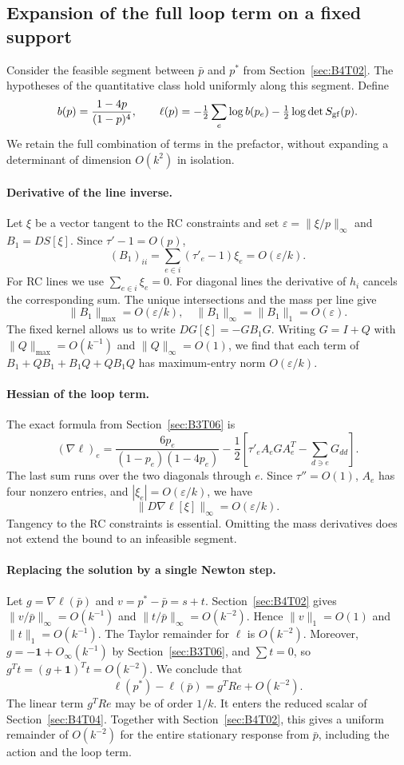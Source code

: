 \subsection{Expansion of the full loop term on a fixed support}\label{sec:B4T03}
Consider the feasible segment between $\bar p$ and $p^*$ from Section~\ref{sec:B4T02}.
The hypotheses of the quantitative class hold uniformly along this segment.
Define
\[
 b(p)=\frac{1-4p}{(1-p)^4},\qquad
 \ell(p)=-\tfrac12\sum_e\log b(p_e)-\tfrac12\log\det S_{\rm gf}(p).
\]
We retain the full combination of terms in the prefactor, without expanding a determinant of dimension
$O(k^2)$ in isolation.

\paragraph{Derivative of the line inverse.}
Let $\xi$ be a vector tangent to the RC constraints and set $\varepsilon=\|\xi/p\|_\infty$ and
$B_1=DS[\xi]$. Since $\tau'-1=O(p)$,
\[
 (B_1)_{ii}=\sum_{e\in i}(\tau'_e-1)\xi_e=O(\varepsilon/k).
\]
For RC lines we use $\sum_{e\in i}\xi_e=0$. For diagonal lines the derivative of $h_i$ cancels the
corresponding sum. The unique intersections and the mass per line give
\[
 \|B_1\|_{\max}=O(\varepsilon/k),\quad
 \|B_1\|_\infty=\|B_1\|_1=O(\varepsilon).
\]
The fixed kernel allows us to write $DG[\xi]=-GB_1G$. Writing $G=I+Q$ with $\|Q\|_{\max}=O(k^{-1})$ and
$\|Q\|_\infty=O(1)$, we find that each term of $B_1+QB_1+B_1Q+QB_1Q$ has maximum-entry norm
$O(\varepsilon/k)$.

\paragraph{Hessian of the loop term.}
The exact formula from Section~\ref{sec:B3T06} is
\[
 (\nabla\ell)_e=\frac{6p_e}{(1-p_e)(1-4p_e)}
 -\frac12\left[\tau'_e A_eGA_e^T-\sum_{d\ni e}G_{dd}\right].
\]
The last sum runs over the two diagonals through $e$.
Since $\tau''=O(1)$, $A_e$ has four nonzero entries, and $|\xi_e|=O(\varepsilon/k)$, we have
\[
 \boxed{\|D\nabla\ell[\xi]\|_\infty=O(\varepsilon/k).}
\]
Tangency to the RC constraints is essential. Omitting the mass derivatives does not extend the bound to an
infeasible segment.

\paragraph{Replacing the solution by a single Newton step.}
Let $g=\nabla\ell(\bar p)$ and $v=p^*-\bar p=s+t$.
Section~\ref{sec:B4T02} gives $\|v/\bar p\|_\infty=O(k^{-1})$ and $\|t/\bar p\|_\infty=O(k^{-2})$. Hence
$\|v\|_1=O(1)$ and $\|t\|_1=O(k^{-1})$.
The Taylor remainder for $\ell$ is $O(k^{-2})$. Moreover, $g=-\mathbf1+O_\infty(k^{-1})$ by
Section~\ref{sec:B3T06}, and $\sum t=0$, so $g^Tt=(g+\mathbf1)^Tt=O(k^{-2})$.
We conclude that
\[
 \boxed{\ell(p^*)-\ell(\bar p)=g^TRe+O(k^{-2}).}
\]
The linear term $g^TRe$ may be of order $1/k$. It enters the reduced scalar of Section~\ref{sec:B4T04}.
Together with Section~\ref{sec:B4T02}, this gives a uniform remainder of $O(k^{-2})$ for the entire
stationary response from $\bar p$, including the action and the loop term.
